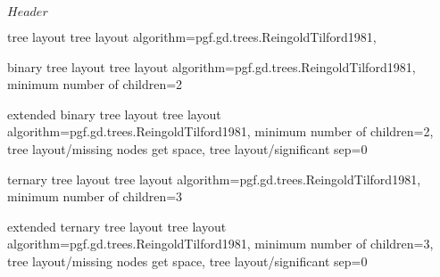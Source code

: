 %
%
%

\ProvidesFileRCS[v\pgfversion] $Header$




%
%

%
%
% 
% 






%
%
\pgfgddeclarealgorithmkey
  {tree layout}
  {tree layout}
  {
    algorithm=pgf.gd.trees.ReingoldTilford1981,
  }

%
%
\pgfgddeclarealgorithmkey
  {binary tree layout}
  {tree layout}
  {
    algorithm=pgf.gd.trees.ReingoldTilford1981,
    minimum number of children=2
  }

%
%
\pgfgddeclarealgorithmkey
  {extended binary tree layout}
  {tree layout}
  {
    algorithm=pgf.gd.trees.ReingoldTilford1981,
    minimum number of children=2,
    tree layout/missing nodes get space,
    tree layout/significant sep=0
  }

%
%
\pgfgddeclarealgorithmkey
  {ternary tree layout}
  {tree layout}
  {
    algorithm=pgf.gd.trees.ReingoldTilford1981,
    minimum number of children=3
  }

%
%
\pgfgddeclarealgorithmkey
  {extended ternary tree layout}
  {tree layout}
  {
    algorithm=pgf.gd.trees.ReingoldTilford1981,
    minimum number of children=3,
    tree layout/missing nodes get space,
    tree layout/significant sep=0
  }





\endinput
